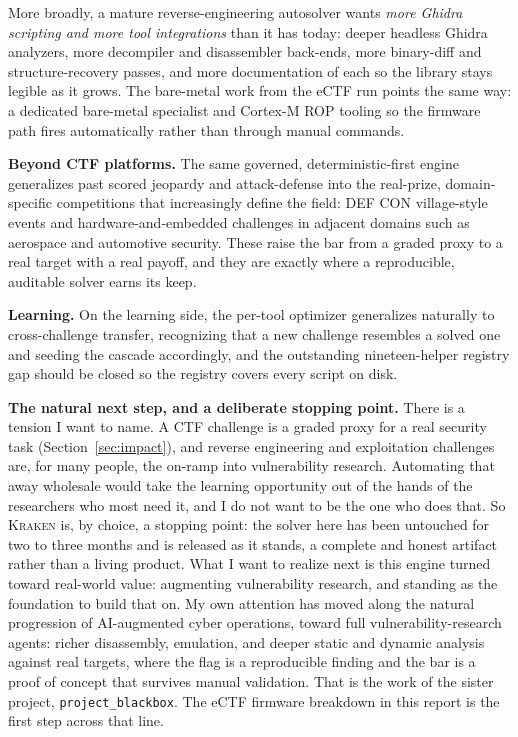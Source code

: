 \documentclass[10pt,twocolumn]{article}
\newcommand{\kraken}{\textsc{Kraken}}
\begin{document}
More broadly, a mature reverse-engineering
autosolver wants \emph{more Ghidra scripting and more tool integrations} than it has today: deeper headless
Ghidra analyzers, more decompiler and disassembler back-ends, more binary-diff and structure-recovery passes,
and more documentation of each so the library stays legible as it grows. The bare-metal work from the eCTF run
points the same way: a dedicated bare-metal specialist and Cortex-M ROP tooling so the firmware path fires
automatically rather than through manual commands.

\medskip
\textbf{Beyond CTF platforms.} The same governed, deterministic-first engine generalizes past scored jeopardy
and attack-defense into the real-prize, domain-specific competitions that increasingly define the field:
DEF CON village-style events and hardware-and-embedded challenges in adjacent domains such as aerospace and
automotive security. These raise the bar from a graded proxy to a real target with a real payoff, and they are
exactly where a reproducible, auditable solver earns its keep.

\medskip
\textbf{Learning.} On the learning side, the per-tool optimizer generalizes naturally to cross-challenge
transfer, recognizing that a new challenge resembles a solved one and seeding the cascade accordingly, and the
outstanding nineteen-helper registry gap should be closed so the registry covers every script on disk.

\medskip
\textbf{The natural next step, and a deliberate stopping point.} There is a tension I want to name. A CTF
challenge is a graded proxy for a real security task (Section~\ref{sec:impact}), and reverse engineering and
exploitation challenges are, for many people, the on-ramp into vulnerability research. Automating that away
wholesale would take the learning opportunity out of the hands of the researchers who most need it, and I do
not want to be the one who does that. So \kraken{} is, by choice, a stopping point: the solver here has been
untouched for two to three months and is released as it stands, a complete and honest artifact rather than a
living product. What I want to realize next is this engine turned toward real-world value: augmenting
vulnerability research, and standing as the foundation to build that on. My own attention has moved along the
natural progression of AI-augmented cyber operations, toward full vulnerability-research agents: richer
disassembly, emulation, and deeper static and dynamic analysis against real targets, where the flag is a
reproducible finding and the bar is a proof of concept that survives manual validation. That is the work of
the sister project, \texttt{project\_blackbox}. The eCTF firmware breakdown in this report is the first step
across that line.
\end{document}

